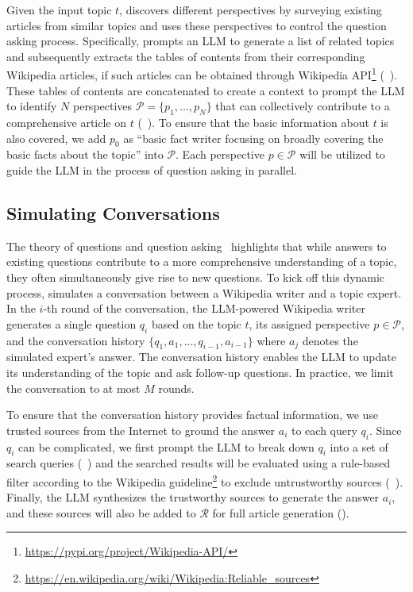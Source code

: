 Given the input topic $t$, \system discovers different perspectives by surveying existing articles from similar topics and uses these perspectives to control the question asking process. Specifically, \system prompts an LLM to generate a list of related topics and subsequently extracts the tables of contents from their corresponding Wikipedia articles, if such articles can be obtained through Wikipedia API\footnote{\url{https://pypi.org/project/Wikipedia-API/}} (~). These tables of contents are concatenated to create a context to prompt the LLM to identify $N$ perspectives $\mathcal{P}=\{p_1,...,p_N\}$ that can collectively contribute to a comprehensive article on $t$ (~). To ensure that the basic information about $t$ is also covered, we add $p_0$ as ``basic fact writer focusing on broadly covering the basic facts about the topic'' into $\mathcal{P}$. Each perspective $p \in\mathcal{P}$ will be utilized to guide the LLM in the process of question asking in parallel. 

\subsection{Simulating Conversations}
\label{sec:method_conv}
The theory of questions and question asking~\citep{ram1991theory} highlights that while answers to existing questions contribute to a more comprehensive understanding of a topic, they often simultaneously give rise to new questions. To kick off this dynamic process, \system simulates a conversation between a Wikipedia writer and a topic expert. In the $i$-th round of the conversation, the LLM-powered Wikipedia writer generates a single question $q_i$ based on the topic $t$, its assigned perspective $p\in\mathcal{P}$, and the conversation history $\{q_1, a_1,...,q_{i-1}, a_{i-1}\}$ where $a_j$ denotes the simulated expert's answer. The conversation history enables the LLM to update its understanding of the topic and ask follow-up questions. In practice, we limit the conversation to at most $M$ rounds.

To ensure that the conversation history provides factual information, we use trusted sources from the Internet to ground the answer $a_i$ to each query $q_i$. 
Since $q_i$ can be complicated, we first prompt the LLM to break down $q_i$ into a set of search queries (~) and the searched results will be evaluated using a rule-based filter according to the Wikipedia guideline\footnote{\url{https://en.wikipedia.org/wiki/Wikipedia:Reliable_sources}} to exclude untrustworthy sources (~). Finally, the LLM synthesizes the trustworthy sources to generate the answer $a_i$, and these sources will also be added to $\mathcal{R}$ for full article generation ().


